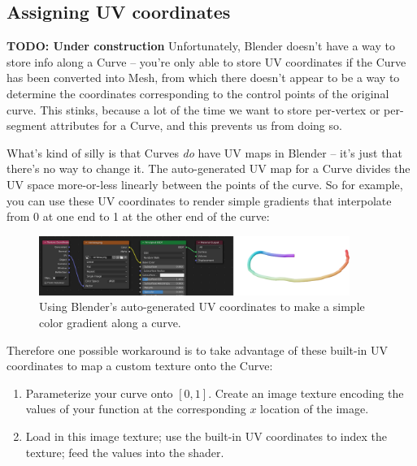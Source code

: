 \documentclass[10pt]{article}
\begin{document}
\subsection{Assigning UV coordinates}
{\bf TODO: Under construction}
Unfortunately, Blender doesn't have a way to store info along a Curve -- you're only able to store UV coordinates if the Curve has been converted into Mesh, from which there doesn't appear to be a way to determine the coordinates corresponding to the control points of the original curve. This stinks, because a lot of the time we want to store per-vertex or per-segment attributes for a Curve, and this prevents us from doing so.

What's kind of silly is that Curves \emph{do} have UV maps in Blender -- it's just that there's no way to change it. The auto-generated UV map for a Curve divides the UV space more-or-less linearly between the points of the curve. So for example, you can use these UV coordinates to render simple gradients that interpolate from 0 at one end to 1 at the other end of the curve:
\begin{figure}[H]
    \centering
    \includegraphics[width=0.9\textwidth]{images/curve_auto_uv.png}
    \caption{Using Blender's auto-generated UV coordinates to make a simple color gradient along a curve.}
    \label{fig:curve_auto_uv}
\end{figure}

Therefore one possible workaround is to take advantage of these built-in UV coordinates to map a custom texture onto the Curve:
\begin{enumerate}
    \item Parameterize your curve onto $[0,1]$. Create an image texture encoding the values of your function at the corresponding $x$ location of the image.
    \item Load in this image texture; use the built-in UV coordinates to index the texture; feed the values into the shader.
\end{enumerate}
\end{document}
